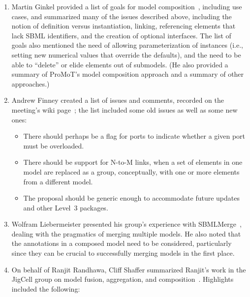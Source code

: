 \begin{enumerate}

\item Martin Ginkel provided a list of goals for model composition~\citep{ginkel:2007}, including use cases, and summarized many of the issues described above, including the notion of definition versus instantiation, linking, referencing elements that lack SBML identifiers, and the creation of optional interfaces.  The list of goals also mentioned the need of allowing parameterization of instances (i.e., setting new numerical values that override the defaults), and the need to be able to ``delete'' or elide elements out of submodels.  (He also provided a summary of ProMoT's model composition approach and a summary of other approaches.)

\item Andrew Finney created a list of issues and comments, recorded on the meeting's wiki page~\citep{finney:2007}; the list included some old issues as well as some new ones:

  \begin{itemize}

  \item There should perhaps be a flag for ports to indicate whether a given port must be overloaded.

  \item There should be support for N-to-M links, when a set of elements in one model are replaced as a group, conceptually, with one or more elements from a different model. 

  \item The proposal should be generic enough to accommodate future updates and other Level~3 packages.

  \end{itemize}
  
\item Wolfram Liebermeister presented his group's experience with SBMLMerge~\citep{liebermeister:2007}, dealing with the pragmatics of merging multiple models.  He also noted that the annotations in a composed model need to be considered, particularly since they can be crucial to successfully merging models in the first place.

\item On behalf of Ranjit Randhawa, Cliff Shaffer summarized Ranjit's work in the JigCell group on model fusion, aggregation, and composition~\citep{randhawa:2007}.  Highlights included the following:

  \begin{itemize}


\end{itemize}
\end{enumerate}
